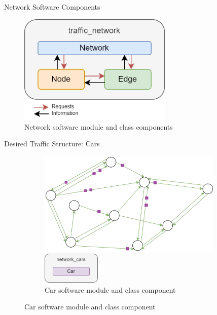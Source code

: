     \begin{frame}{Network Software Components}
        \begin{figure}
            \centering
            \includegraphics[height=5.25cm]{Images/traffic_network_module.png}
            \caption{Network software module and class components}
        \end{figure}
    \end{frame}


    \begin{frame}{Desired Traffic Structure:  Cars}
        \begin{figure}
            \centering
            \begin{figure}[ht]
                \begin{minipage}[b]{0.55\linewidth}
                    \centering
                    \includegraphics[width=\textwidth, height=5cm]{Images/Network_general_cars.png}
            \caption{Cars (purple squares) moving along the network}
                    \label{fig:a}
                \end{minipage}
                \hspace{0.5cm}
                \begin{minipage}[b]{0.25\linewidth}
                    \centering
                    \includegraphics[width=\textwidth, height=1.5cm]{Images/car_module.png}
                    \caption{Car software module and class component}
                    \label{fig:b}
                \end{minipage}
            \end{figure}
        \end{figure}
    \end{frame}
    

